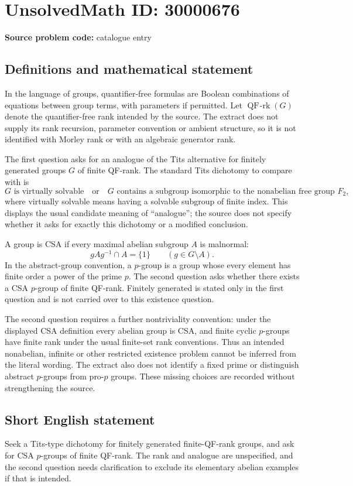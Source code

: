 \documentclass[11pt]{article}
\begin{document}
\section*{UnsolvedMath ID: 30000676}
\textbf{Source problem code:} catalogue entry
\subsection{Definitions and mathematical statement}
In the language of groups, quantifier-free formulas are Boolean combinations of equations between group terms, with parameters if permitted. Let $\operatorname{QF\!\text{-}rk}(G)$ denote the quantifier-free rank intended by the source. The extract does not supply its rank recursion, parameter convention or ambient structure, so it is not identified with Morley rank or with an algebraic generator rank.

The first question asks for an analogue of the Tits alternative for finitely generated groups $G$ of finite QF-rank. The standard Tits dichotomy to compare with is
\[
G\text{ is virtually solvable}\quad\text{or}\quad
G\text{ contains a subgroup isomorphic to the nonabelian free group }F_2,
\]
where virtually solvable means having a solvable subgroup of finite index. This displays the usual candidate meaning of ``analogue''; the source does not specify whether it asks for exactly this dichotomy or a modified conclusion.

A group is CSA if every maximal abelian subgroup $A$ is malnormal:
\[
gAg^{-1}\cap A=\{1\}\qquad(g\in G\setminus A).
\]
In the abstract-group convention, a $p$-group is a group whose every element has finite order a power of the prime $p$. The second question asks whether there exists a CSA $p$-group of finite QF-rank. Finitely generated is stated only in the first question and is not carried over to this existence question.

The second question requires a further nontriviality convention: under the displayed CSA definition every abelian group is CSA, and finite cyclic $p$-groups have finite rank under the usual finite-set rank conventions. Thus an intended nonabelian, infinite or other restricted existence problem cannot be inferred from the literal wording. The extract also does not identify a fixed prime or distinguish abstract $p$-groups from pro-$p$ groups. These missing choices are recorded without strengthening the source.
\subsection{Short English statement}
Seek a Tits-type dichotomy for finitely generated finite-QF-rank groups, and ask for CSA $p$-groups of finite QF-rank. The rank and analogue are unspecified, and the second question needs clarification to exclude its elementary abelian examples if that is intended.
\end{document}
